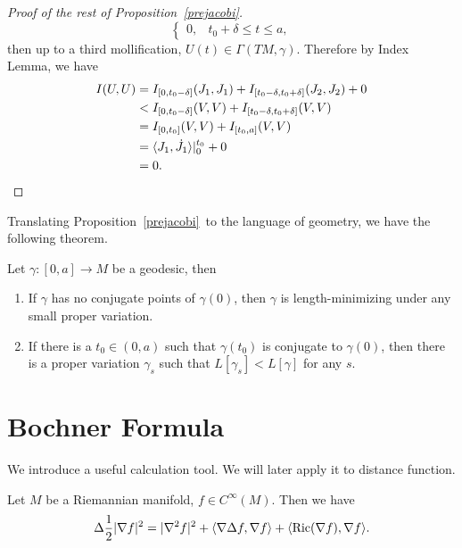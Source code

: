 \begin{proof}[Proof of the rest of Proposition~\ref{prejacobi}]
\[\begin{cases}
        0, & t_0+\delta\leq t\leq a,
    \end{cases}\]
    then up to a third mollification, $U(t)\in\Gamma(TM,\gamma)$.
    Therefore by Index Lemma, we have
    \begin{align*}
        I(U,U)&=I_{[0,t_0-\delta]}(J_1,J_1)+I_{[t_0-\delta,t_0+\delta]}(J_2,J_2)+0\\
        &<I_{[0,t_0-\delta]}(V,V)+I_{[t_0-\delta,t_0+\delta]}(V,V)\\
        &=I_{[0,t_0]}(V,V)+I_{[t_0,a]}(V,V)\\
        &=\langle J_1,\dot{J}_1\rangle|_0^{t_0}+0\\
        &=0.\qedhere
    \end{align*}
\end{proof}

Translating Proposition~\ref{prejacobi}~to the language of geometry, we have the following theorem.
\begin{thm}[Jacobi]\label{jacobi thm}
    Let $\gamma:[0,a]\to M$ be a geodesic, then
    \begin{enumerate}[(1)]
        \item If $\gamma$ has no conjugate points of $\gamma(0)$, then $\gamma$ is length-minimizing under any small proper variation.
        \item If there is a $t_0\in(0,a)$ such that $\gamma(t_0)$ is conjugate to $\gamma(0)$, then there is a proper variation $\gamma_s$ such that $L[\gamma_s]<L[\gamma]$ for any $s$.
    \end{enumerate}
\end{thm}

\section{Bochner Formula}
We introduce a useful calculation tool.
We will later apply it to distance function.

\begin{thm}
    Let $M$ be a Riemannian manifold, $f\in C^\infty(M)$.
    Then we have
    \[\Delta\frac{1}{2}|\nabla f|^2=|\nabla^2f|^2+\langle\nabla\Delta f,\nabla f\rangle+\langle\operatorname{Ric}(\nabla f),\nabla f\rangle.\]
\end{thm}

